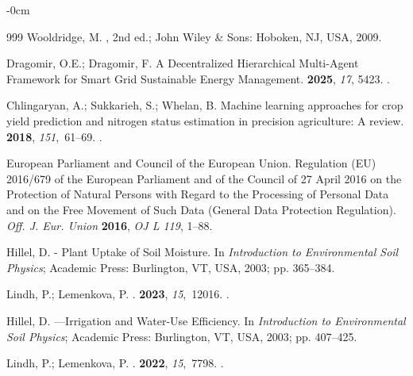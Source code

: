 \documentclass[land,review,accept,pdftex,oneauthor]{Definitions/mdpi}
\begin{document}
\begin{adjustwidth}{-\extralength}{0cm}
\begin{thebibliography}{999}
Wooldridge, M.
, 2nd ed.; John Wiley \&
  Sons:  Hoboken, NJ, USA, %
  2009.

Dragomir, O.E.; Dragomir, F.
\newblock A Decentralized Hierarchical Multi-Agent Framework for Smart Grid
  Sustainable Energy Management.
 {\bf 2025}, {\em 17}, 5423.
.

Chlingaryan, A.; Sukkarieh, S.; Whelan, B.
\newblock Machine learning approaches for crop yield prediction and nitrogen
  status estimation in precision agriculture: A review.
 {\bf 2018}, {\em
  151},~61--69.
.

{European Parliament and Council of the European Union}.
\newblock Regulation ({EU}) 2016/679 of the European Parliament and of the
  Council of 27 April 2016 on the Protection of Natural Persons with Regard to
  the Processing of Personal Data and on the Free Movement of Such Data
  (General Data Protection Regulation).
\newblock \emph{Off. J. Eur. Union} \textbf{2016},
\newblock \emph{OJ L 119}, 1--88.

Hillel, D.
 - Plant Uptake of Soil Moisture. In {\em Introduction to
  Environmental Soil Physics}; Academic Press: Burlington, VT, USA,  2003; pp. 365--384.

Lindh, P.; Lemenkova, P.
.
 {\bf 2023}, {\em 15},~12016.
.

Hillel, D.
---Irrigation and Water-Use Efficiency. In {\em Introduction to
  Environmental Soil Physics}; Academic Press: Burlington, VT, USA, 2003; pp. 407--425.

Lindh, P.; Lemenkova, P.
.
 {\bf 2022}, {\em 15},~7798.
.


\end{thebibliography}
\end{adjustwidth}
\end{document}
